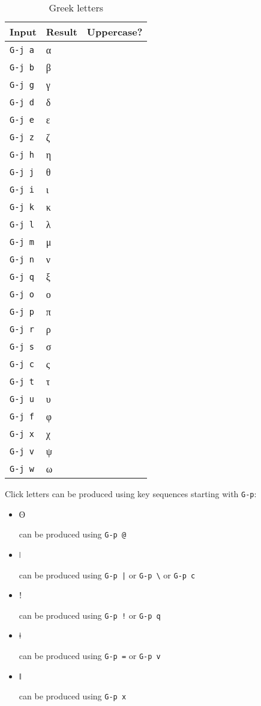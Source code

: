 \documentclass[oneside]{memoir}
\newcommand{\cmark}{\ding{51}}
\newcommand{\xmark}{\ding{55}}
\newcommand{\key}{\verb}
\newcommand{\out}[1]{\colorbox{gray!20}{\strut{}#1}}
\begin{document}
{{{\begin{wraptable}[20]{r}{5cm}
\centering
\caption{Greek letters}
\label{tab:greek_letters}
\begin{tabular}{lll}
\toprule
Input & Result & Uppercase? \\
\midrule
\key|G-j a| & α & \cmark \\
\key|G-j b| & β & \cmark \\
\key|G-j g| & γ & \cmark \\
\key|G-j d| & δ & \cmark \\
\key|G-j e| & ε & \cmark \\
\key|G-j z| & ζ & \cmark \\
\key|G-j h| & η & \cmark \\
\key|G-j j| & θ & \cmark \\
\key|G-j i| & ι & \cmark \\
\key|G-j k| & κ & \cmark \\
\key|G-j l| & λ & \cmark \\
\key|G-j m| & μ & \cmark \\
\key|G-j n| & ν & \cmark \\
\key|G-j q| & ξ & \cmark \\
\key|G-j o| & ο & \cmark \\
\key|G-j p| & π & \cmark \\
\key|G-j r| & ρ & \cmark \\
\key|G-j s| & σ & \cmark \\
\key|G-j c| & ς & \xmark \\
\key|G-j t| & τ & \cmark \\
\key|G-j u| & υ & \cmark \\
\key|G-j f| & φ & \cmark \\
\key|G-j x| & χ & \cmark \\
\key|G-j v| & ψ & \cmark \\
\key|G-j w| & ω & \cmark \\
\bottomrule
\end{tabular}
\end{wraptable}

Click letters can be produced using key sequences starting with \key|G-p|:

\begin{itemize}[noitemsep]
\item \out{ʘ} can be produced using \key|G-p @|
\item \out{ǀ} can be produced using \key!G-p |! or \key|G-p \| or \key|G-p c|
\item \out{ǃ} can be produced using \key|G-p !| or \key|G-p q|
\item \out{ǂ} can be produced using \key|G-p =| or \key|G-p v|
\item \out{ǁ} can be produced using \key|G-p x|
\end{itemize}

}}}
\end{document}
